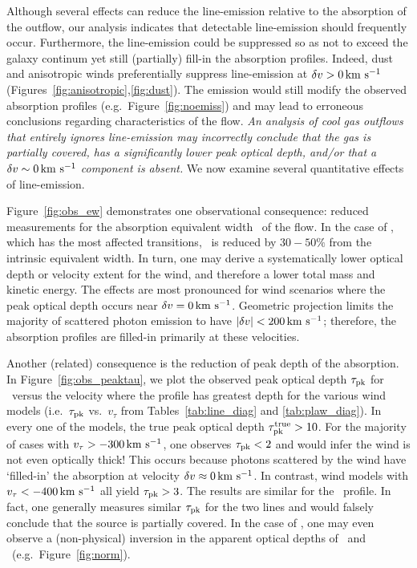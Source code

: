 \documentclass[12pt,preprint]{aastex}
\begin{document}
Although several effects can reduce the line-emission
relative to the absorption of the outflow, our analysis
indicates that detectable line-emission should frequently occur. 
Furthermore, the line-emission could be suppressed so as not to exceed
the galaxy continum yet still (partially) fill-in the absorption
profiles. Indeed, dust and anisotropic winds preferentially suppress
line-emission at $\delta v > 0 \, {\rm km~s^{-1}}$
(Figures~\ref{fig:anisotropic},\ref{fig:dust}).
The emission would still 
modify the observed absorption profiles (e.g.\
Figure~\ref{fig:noemiss}) and may lead to erroneous conclusions
regarding characteristics of the flow.  {\it An analysis of cool gas outflows
that entirely ignores line-emission may incorrectly conclude that the gas is
partially covered, has a significantly lower peak optical depth,
and/or that a $\delta v \sim 0 \, {\rm km~s^{-1}}$ component is
absent.}  
We now examine several quantitative effects of line-emission.

Figure~\ref{fig:obs_ew} demonstrates one observational
consequence: reduced measurements for the absorption
equivalent width \ewabs\ of the flow.  In the case of ,
which has the most affected transitions, \ewabs\ is reduced by
$30-50\%$ from the intrinsic equivalent width.  In turn, one may derive 
a systematically lower optical depth or velocity extent for the wind,
and therefore a lower total mass and kinetic energy.  
The effects are most pronounced for wind
scenarios where the peak optical depth occurs near $\delta v = 0 \, {\rm km~s^{-1}}$.
Geometric projection limits the majority of scattered photon emission to
have $|\delta v| < 200 \, {\rm km~s^{-1}}$; therefore,  the absorption profiles
are filled-in primarily at these velocities.  

Another (related) consequence is the reduction of peak depth of the
absorption.
In Figure~\ref{fig:obs_peaktau}, we plot the observed peak optical depth
$\tau_{\rm pk}$ for \mgiia\ 
versus the velocity where the profile has greatest depth 
for the various wind models (i.e.\
$\tau_{\rm pk}$ vs.\ $v_\tau$ from Tables~\ref{tab:line_diag} and
\ref{tab:plaw_diag}).   In every one of the models, the true peak
optical depth $\tau_{\rm pk}^{\rm true} > 10$.  For the
majority of cases with $v_\tau > -300\, {\rm km~s^{-1}}$, one observes $\tau_{\rm pk} <
2$ and would infer the wind is not even optically thick!
This occurs because photons scattered by the wind have `filled-in' the
absorption at velocity $\delta v \approx 0 \, {\rm km~s^{-1}}$.  In contrast, wind
models with $v_\tau < -400 \, {\rm km~s^{-1}}$ all yield $\tau_{\rm pk} > 3$.  The
results are similar for the \mgiib\ profile.  In fact, one generally
measures similar $\tau_{\rm pk}$ for the two \ion{Mg}{2} lines and would 
falsely conclude that the source is partially covered. 
In the case of \ion{Fe}{2}, one may even observe a (non-physical)
inversion in the apparent optical depths of \feiia\ and \feiib\ (e.g.\
Figure~\ref{fig:norm}). 
\end{document}
